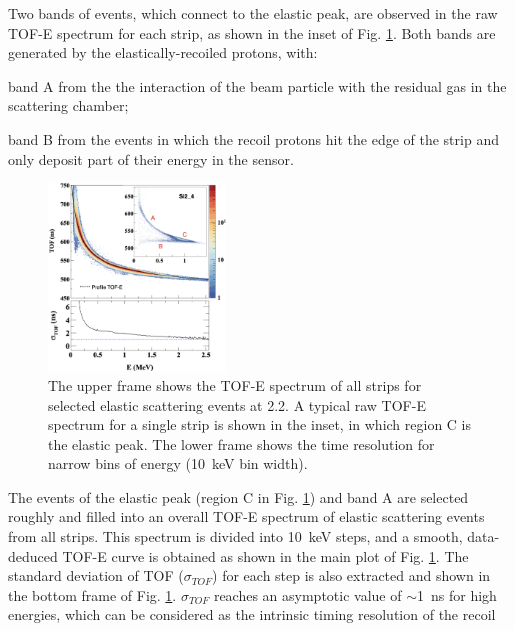 \documentclass[number,5p]{elsarticle}
\begin{document}
Two bands of events, which connect to the elastic peak, are observed in the raw TOF-E spectrum for each strip, as shown in the inset of Fig. \ref{fig:tof-e}.
Both bands are generated by the elastically-recoiled protons, with:
\begin{enumerate*}[label=(\roman*)]
\item band A from the the interaction of the beam particle with the residual gas
  in the scattering chamber;
\item band B from the events in which the recoil protons hit the edge of the strip and only deposit part of their energy in the sensor.
\end{enumerate*}
\begin{figure}[tb!]
  \centering
  \includegraphics[width=0.42\textwidth]{./tofe_tsigma.png}
  \caption{
    The upper frame shows the TOF-E spectrum of all strips for selected elastic
    scattering events at \SI{2.2}{\momentum}.
    A typical raw TOF-E spectrum for a single strip is shown in the inset, in
    which region C is the elastic peak.
    The lower frame shows the time resolution for narrow bins of energy
    (\SI{10}{\keV} bin width).
    }
  \label{fig:tof-e}
\end{figure}
The events of the elastic peak (region C in Fig. \ref{fig:tof-e}) and band A are selected roughly and filled into an overall TOF-E spectrum of elastic scattering events from all strips.
This spectrum is divided into \SI{10}{\keV} steps,  and a smooth, data-deduced TOF-E curve is obtained as shown in the main plot of Fig. \ref{fig:tof-e}.
The standard deviation of TOF ($\sigma_{TOF}$) for each step is also extracted and shown in the bottom frame of Fig. \ref{fig:tof-e}.
$\sigma_{TOF}$ reaches an asymptotic value of $\sim$\SI{1}{\ns} for high energies, which can be considered as the intrinsic timing resolution of the recoil
\end{document}
